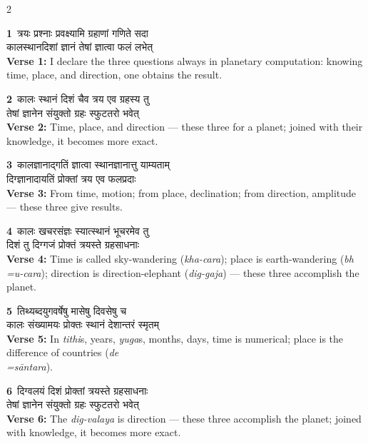 \documentclass[11pt,a4paper]{article}
\newcommand{\dev}[1]{{\devanagarifont #1}}
\newcommand{\iast}[1]{\textit{#1}}
\newcommand{\vnum}[1]{\textcolor{versenumbercolor}{\textbf{#1}}}
\begin{document}
\begin{paracol}{2}

\switchcolumn[0]
\vnum{1}\ \dev{त्रयः प्रश्नाः प्रवक्ष्यामि ग्रहाणां गणिते सदा}\\
\dev{कालस्थानदिशां ज्ञानं तेषां ज्ञात्वा फलं लभेत्}\\
\switchcolumn[1]
\textbf{Verse 1:} I declare the three questions always in planetary computation: knowing time, place, and direction, one obtains the result.

\switchcolumn[0]
\vnum{2}\ \dev{कालः स्थानं दिशं चैव त्रय एव ग्रहस्य तु}\\
\dev{तेषां ज्ञानेन संयुक्तो ग्रहः स्फुटतरो भवेत्}\\
\switchcolumn[1]
\textbf{Verse 2:} Time, place, and direction --- these three for a planet; joined with their knowledge, it becomes more exact.

\switchcolumn[0]
\vnum{3}\ \dev{कालज्ञानाद्गतिं ज्ञात्वा स्थानज्ञानात्तु याम्यताम्}\\
\dev{दिग्ज्ञानादायतिं प्रोक्तां त्रय एव फलप्रदाः}\\
\switchcolumn[1]
\textbf{Verse 3:} From time, motion; from place, declination; from direction, amplitude --- these three give results.

\switchcolumn[0]
\vnum{4}\ \dev{कालः खचरसंज्ञः स्यात्स्थानं भूचरमेव तु}\\
\dev{दिशं तु दिग्गजं प्रोक्तं त्रयस्ते ग्रहसाधनाः}\\
\switchcolumn[1]
\textbf{Verse 4:} Time is called sky-wandering (\iast{kha-cara}); place is earth-wandering (\iast{bh\\=u-cara}); direction is direction-elephant (\iast{dig-gaja}) --- these three accomplish the planet.

\switchcolumn[0]
\vnum{5}\ \dev{तिथ्यब्दयुगवर्षेषु मासेषु दिवसेषु च}\\
\dev{कालः संख्यामयः प्रोक्तः स्थानं देशान्तरं स्मृतम्}\\
\switchcolumn[1]
\textbf{Verse 5:} In \iast{tithi}s, years, \iast{yuga}s, months, days, time is numerical; place is the difference of countries (\iast{de\\=s\=antara}).

\switchcolumn[0]
\vnum{6}\ \dev{दिग्वलयं दिशं प्रोक्तां त्रयस्ते ग्रहसाधनाः}\\
\dev{तेषां ज्ञानेन संयुक्तो ग्रहः स्फुटतरो भवेत्}\\
\switchcolumn[1]
\textbf{Verse 6:} The \iast{dig-valaya} is direction --- these three accomplish the planet; joined with knowledge, it becomes more exact.


\end{paracol}
\end{document}
